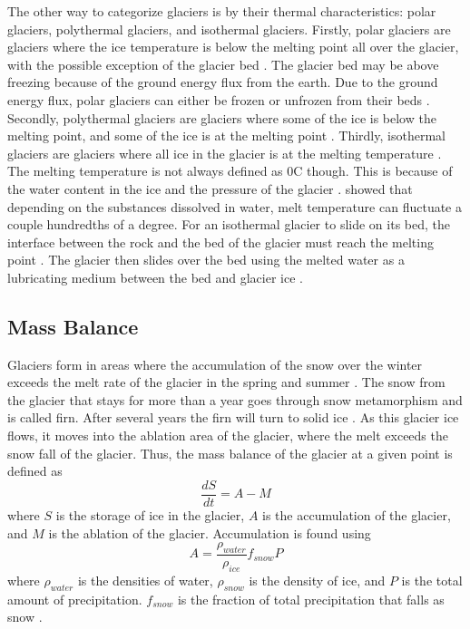 \documentclass{article}
\begin{document}
The other way to categorize glaciers is by their thermal characteristics: polar glaciers, polythermal glaciers, and isothermal glaciers. Firstly, polar glaciers are glaciers where the ice temperature is below the melting point all over the glacier, with the possible exception of the glacier bed \citep{Hooke2013}. The glacier bed may be above freezing because of the ground energy flux from the earth. Due to the ground energy flux, polar glaciers can either be frozen or unfrozen from their beds \citep{Hooke2013}. Secondly, polythermal glaciers are glaciers where some of the ice is below the melting point, and some of the ice is at the melting point \citep{Hooke2013}. Thirdly, isothermal glaciers are glaciers where all ice in the glacier is at the melting temperature \citep{Hooke2013}. The melting temperature is not always defined as 0C though. This is because of the water content in the ice and the pressure of the glacier \citep{Lliboutry1976}. \citet{Lliboutry1976} showed that depending on the substances dissolved in water, melt temperature can fluctuate a couple hundredths of a degree. For an isothermal glacier to slide on its bed, the interface between the rock and the bed of the glacier must reach the melting point \citep{Lliboutry1976}. The glacier then slides over the bed using the melted water as a lubricating medium between the bed and glacier ice \citep{Fowler1979}. 

\subsection{Mass Balance}
Glaciers form in areas where the accumulation of the snow over the winter exceeds the melt rate of the glacier in the spring and summer \citep{Hooke2013}. The snow from the glacier that stays for more than a year goes through snow metamorphism and is called firn. After several years the firn will turn to solid ice \citep{Hooke2013}. As this glacier ice flows, it moves into the ablation area of the glacier, where the melt exceeds the snow fall of the glacier. Thus, the mass balance of the glacier at a given point is defined as 
\begin{equation}
    \frac{dS}{dt} = A - M
\end{equation}
where $S$ is the storage of ice in the glacier, $A$ is the accumulation of the glacier, and $M$ is the ablation of the glacier. Accumulation is found using 
\begin{equation}\label{Accumulation}
A = \frac{\rho_{water}}{\rho_{ice}}f_{snow}P
\end{equation}
where $\rho_{water}$ is the densities of water, $\rho_{snow}$ is the density of ice, and $P$ is the total amount of precipitation. $f_{snow}$ is the fraction of total precipitation that falls as snow \citep{Jarosch2013}.
\end{document}
